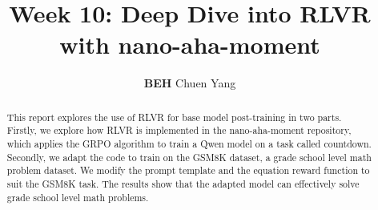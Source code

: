 \documentclass{article} %
\title{Week 10: Deep Dive into RLVR with nano-aha-moment}
\author{\textbf{BEH} Chuen Yang}
\theoremstyle{definition}
\begin{document}
\ifcolmsubmission
\linenumbers
\fi

\maketitle

\begin{abstract}
    This report explores the use of RLVR for base model post-training in two parts.
    Firstly, we explore how RLVR is implemented in the nano-aha-moment repository, 
    which applies the GRPO algorithm to train a Qwen model on a task called countdown.
    Secondly, we adapt the code to train on the GSM8K dataset, a grade school level math problem dataset.
    We modify the prompt template and the equation reward function to suit the GSM8K task.
    The results show that the adapted model can effectively solve grade school level math problems.
\end{abstract}
\end{document}
